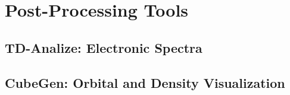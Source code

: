 \chapter{Post-Processing Tools}

\section{TD-Analize: Electronic Spectra}

\section{CubeGen: Orbital and Density Visualization}

